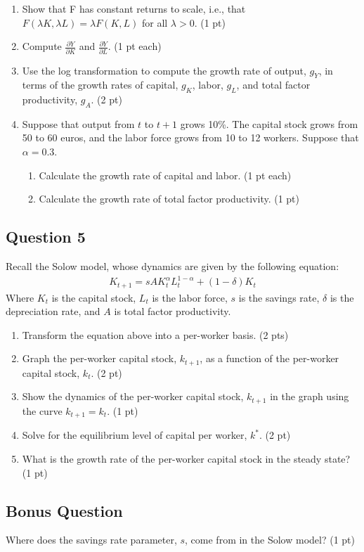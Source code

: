 \documentclass[11pt]{article}
\begin{document}
\begin{enumerate}
    \item Show that F has constant returns to scale, i.e., that \(F(\lambda K, \lambda L) = \lambda F(K,L)\) for all \(\lambda > 0\). (1 pt)
    \item Compute \(\frac{\partial Y }{\partial K} \) and \(\frac{\partial Y }{\partial L} \). (1 pt each)
    \item Use the log transformation to compute the growth rate of output, \(g_Y\), in terms of the growth rates of capital, \(g_K\), labor, 
    \(g_L\), and total factor productivity, \(g_A\). (2 pt)
    \item Suppose that output from \(t\) to \(t+1\) grows 10\%. The capital stock grows from 50 to 60 euros, and the labor
    force grows from 10 to 12 workers. Suppose that \(\alpha = 0.3\).
    \begin{enumerate}
        \item Calculate the growth rate of capital and labor. (1 pt each)
        \item Calculate the growth rate of total factor productivity. (1 pt)
    \end{enumerate}
\end{enumerate}

\subsection*{Question 5}
Recall the Solow model, whose dynamics are given by the following equation:
\begin{align*}
    K_{t+1} = sA K_t^{\alpha}L_t^{1-\alpha} + (1-\delta)K_t
\end{align*}
Where \(K_t\) is the capital stock, \(L_t\) is the labor force, \(s\) is the savings rate, \(\delta\) is the depreciation rate, and \(A\) 
is total factor productivity.

\begin{enumerate}
    \item Transform the equation above into a per-worker basis. (2 pts)
    \item Graph the per-worker capital stock, \(k_{t+1}\), as a function of the per-worker capital stock, \(k_t\). (2 pt)
    \item Show the dynamics of the per-worker capital stock, \(k_{t+1}\) in the graph using the curve \(k_{t+1} = k_t\). (1 pt)
    \item Solve for the equilibrium level of capital per worker, \(k^*\). (2 pt)
    \item What is the growth rate of the per-worker capital stock in the steady state? (1 pt)
\end{enumerate}

\subsection{ Bonus Question}
Where does the savings rate parameter, \(s\), come from in the Solow model? (1 pt)
\end{document}
